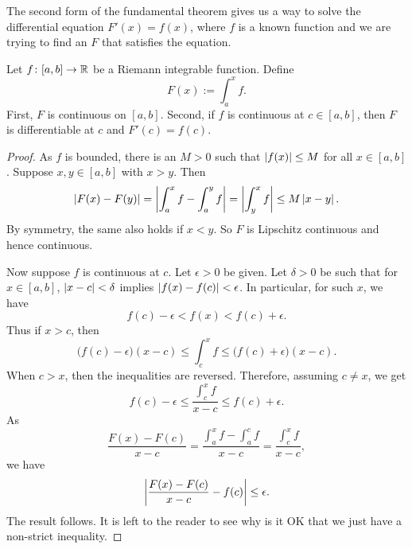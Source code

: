 The second form of the fundamental theorem gives us a way to solve
the differential equation $F'(x) = f(x)$, where $f$ is a known
function and we are trying to find an $F$ that satisfies the equation.

\begin{thm} \label{thm:FTCv2}
Let $f \colon [a,b] \to {\mathbb{R}}$ be a Riemann integrable function.  Define
\begin{equation*}
F(x) := \int_a^x f .
\end{equation*}
First, $F$ is continuous on $[a,b]$.  Second,
if $f$ is continuous at $c \in [a,b]$, then $F$ is differentiable at $c$
and $F'(c) = f(c)$.
\end{thm}

\begin{proof}
As $f$ is bounded, there is an $M > 0$
such that $\left\lvert {f(x)} \right\rvert \leq M$ for all $x \in [a,b]$.  Suppose $x,y \in [a,b]$
with $x > y$.  Then
\begin{equation*}
\left\lvert {F(x)-F(y)} \right\rvert =
\left\lvert {\int_a^x f - \int_a^y f} \right\rvert
=
\left\lvert {\int_y^x f} \right\rvert
\leq
M\left\lvert {x-y} \right\rvert .
\end{equation*}
By symmetry, the same also holds if $x < y$.
So $F$ is Lipschitz continuous and hence continuous.

Now suppose $f$ is continuous at $c$.
Let $\epsilon > 0$ be given.  Let $\delta > 0$ be such that
for $x \in [a,b]$,
$\left\lvert {x-c} \right\rvert < \delta$ implies $\left\lvert {f(x)-f(c)} \right\rvert < \epsilon$.
In particular,
for such $x$, we have
\begin{equation*}
f(c)-\epsilon < f(x) < f(c) + \epsilon.
\end{equation*}
Thus if $x > c$, then
\begin{equation*}
\bigl(f(c)-\epsilon\bigr) (x-c) \leq \int_c^x f \leq
\bigl(f(c) + \epsilon\bigr)(x-c).
\end{equation*}
When $c > x$, then the inequalities are reversed.  Therefore,
assuming $c \not= x$, we get
\begin{equation*}
f(c)-\epsilon
\leq
\frac{\int_c^{x} f}{x-c}
\leq
f(c)+\epsilon .
\end{equation*}
As 
\begin{equation*}
\frac{F(x)-F(c)}{x-c}
=
\frac{\int_a^{x} f - \int_a^{c} f}{x-c}
=
\frac{\int_c^{x} f}{x-c} ,
\end{equation*}
we have 
\begin{equation*}
\left\lvert {\frac{F(x)-F(c)}{x-c} - f(c)} \right\rvert \leq \epsilon .
\end{equation*}
The result follows.  It is left to the reader to see why is it OK that we
just have a non-strict inequality.
\end{proof}

